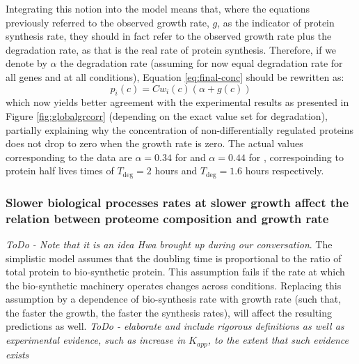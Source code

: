 \documentclass[notitlepage]{article}
\begin{document}
Integrating this notion into the model means that, where the equations previously referred to the observed growth rate, $g$, as the indicator of protein synthesis rate, they should in fact refer to the observed growth rate plus the degradation rate, as that is the real rate of protein synthesis.
Therefore, if we denote by $\alpha$ the degradation rate (assuming for now equal degradation rate for all genes and at all conditions), Equation \ref{eq:final-conc} should be rewritten as:
\begin{equation}
  \label{eq:final-conc-deg}
  p_i(c)=Cw_i(c)(\alpha+g(c))
\end{equation}
which now yields better agreement with the experimental results as presented in Figure \ref{fig:globalgrcorr} (depending on the exact value set for degradation), partially explaining why the concentration of non-differentially regulated proteins does not drop to zero when the growth rate is zero.
The actual values corresponding to the data are $\alpha=0.34$ for \parencite{Valgepea2013} and $\alpha=0.44$ for \parencite{Heinemann2014}, correspoinding to protein half lives times of $T_{\text{deg}}=2$ hours and $T_{\text{deg}}=1.6$ hours respectively.

\subsubsection{Slower biological processes rates at slower growth affect the relation between proteome composition and growth rate}
\emph{ToDo - Note that it is an idea Hwa brought up during our conversation}.
The simplistic model assumes that the doubling time is proportional to the ratio of total protein to bio-synthetic protein.
This assumption fails if the rate at which the bio-synthetic machinery operates changes across conditions.
Replacing this assumption by a dependence of bio-synthesis rate with growth rate (such that, the faster the growth, the faster the synthesis rates), will affect the resulting predictions as well.
\emph{ToDo - elaborate and include rigorous definitions as well as experimental evidence, such as increase in $K_{app}$, to the extent that such evidence exists}
\end{document}
